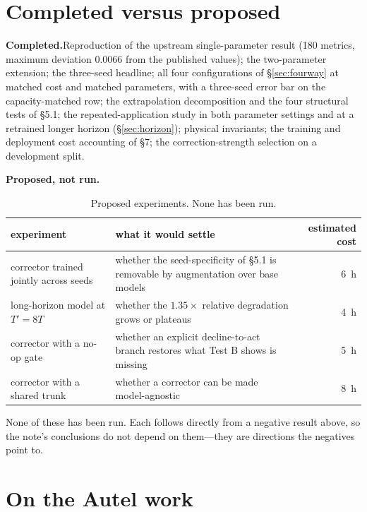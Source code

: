 ﻿\documentclass[11pt,a4paper]{article}
\begin{document}
\section{Completed versus proposed}

\textbf{Completed.}\hspace{0.4em}Reproduction of the upstream single-parameter result (180 metrics,
maximum deviation $0.0066$ from the published values); the two-parameter extension; the three-seed
headline; all four configurations of \S\ref{sec:fourway} at matched cost and matched parameters, with
a three-seed error bar on the capacity-matched row; the extrapolation decomposition and the four
structural tests of \S5.1; the repeated-application study in both parameter settings and at a
retrained longer horizon (\S\ref{sec:horizon}); physical invariants; the training and deployment cost
accounting of \S7; the correction-strength selection on a development split.

\textbf{Proposed, not run.}

\begin{table}[h]
\centering\small
\begin{tabular}{@{}p{}p{}r@{}}
\toprule
experiment & what it would settle & estimated cost \\
\midrule
corrector trained jointly across seeds & whether the seed-specificity of \S5.1 is removable by
  augmentation over base models & \SI{6}{\hour} \\
long-horizon model at $T'=8T$ & whether the $1.35\times$ relative degradation grows or plateaus &
  \SI{4}{\hour} \\
corrector with a no-op gate & whether an explicit decline-to-act branch restores what Test B shows
  is missing & \SI{5}{\hour} \\
corrector with a shared trunk & whether a corrector can be made model-agnostic & \SI{8}{\hour} \\
\bottomrule
\end{tabular}
\caption{Proposed experiments. None has been run.}
\end{table}

None of these has been run. Each follows directly from a negative result above, so the note's
conclusions do not depend on them---they are directions the negatives point to.

\section{On the Autel work}
\end{document}
